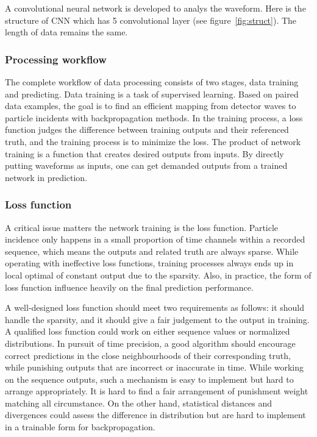 A convolutional neural network is developed to analys the waveform. Here is the structure of CNN which has 5 convolutional layer (see figure~\ref{fig:struct}). The length of data remains the same. 

\subsubsection{Processing workflow}
The complete workflow of data processing consists of two stages, data training and predicting. Data training is a task of supervised learning.  Based on paired data examples, the goal is to find an efficient mapping from detector waves to particle incidents with backpropagation methods. In the training process, a loss function judges the difference between training outputs and their referenced truth, and the training process is to minimize the loss. The product of network training is a function that creates desired outputs from inputs. By directly putting waveforms as inputs, one can get demanded outputs from a trained network in prediction.

\subsubsection{Loss function}
A critical issue matters the network training is the loss function. Particle incidence only happens in a small proportion of time channels within a recorded sequence, which means the outputs and related truth are always sparse. While operating with ineffective loss functions, training processes always ends up in local optimal of constant output due to the sparsity. Also, in practice, the form of loss function influence heavily on the final prediction performance. 

A well-designed loss function should meet two requirements as follows: it should handle the sparsity, and it should give a fair judgement to the output in training. A qualified loss function could work on either sequence values or normalized distributions. In pursuit of time precision, a good algorithm should encourage correct predictions in the close neighbourhoods of their corresponding truth, while punishing outputs that are incorrect or inaccurate in time. While working on the sequence outputs, such a mechanism is easy to implement but hard to arrange appropriately. It is hard to find a fair arrangement of punishment weight matching all circumstance. On the other hand, statistical distances and divergences could assess the difference in distribution but are hard to implement in a trainable form for backpropagation. 


